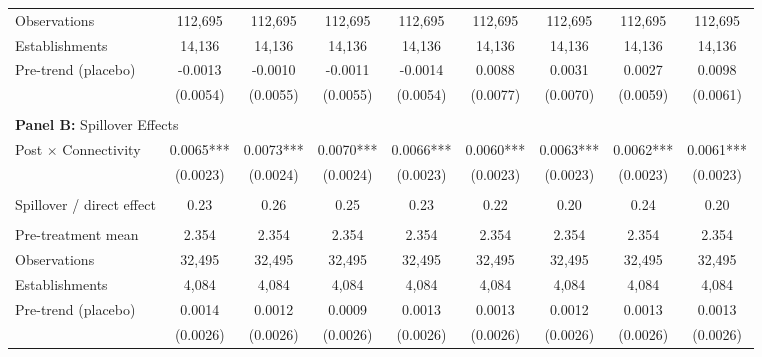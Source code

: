 \begin{table}[H]
\begin{tabular}{lcccccccc}
Observations & 112{,}695 & 112{,}695 & 112{,}695 & 112{,}695 & 112{,}695 & 112{,}695 & 112{,}695 & 112{,}695\\
Establishments & 14{,}136 & 14{,}136 & 14{,}136 & 14{,}136 & 14{,}136 & 14{,}136 & 14{,}136 & 14{,}136\\
\midrule
Pre-trend (placebo) & -0.0013 & -0.0010 & -0.0011 & -0.0014 & 0.0088 & 0.0031 & 0.0027 & 0.0098\\
  & (0.0054) & (0.0055) & (0.0055) & (0.0054) & (0.0077) & (0.0070) & (0.0059) & (0.0061)\\
 &  &  &  &  &  &  &  & \\
 \midrule
\multicolumn{9}{l}{\textbf{Panel B:} Spillover Effects} \\
Post $\times$ Connectivity & 0.0065*** & 0.0073*** & 0.0070*** & 0.0066*** & 0.0060*** & 0.0063*** & 0.0062*** & 0.0061***\\
  & (0.0023) & (0.0024) & (0.0024) & (0.0023) & (0.0023) & (0.0023) & (0.0023) & (0.0023)\\
 &  &  &  &  &  &  &  & \\
Spillover / direct effect & 0.23 & 0.26 & 0.25 & 0.23 & 0.22 & 0.20 & 0.24 & 0.20\\
 &  &  &  &  &  &  &  & \\
Pre-treatment mean & 2.354 & 2.354 & 2.354 & 2.354 & 2.354 & 2.354 & 2.354 & 2.354\\
Observations & 32{,}495 & 32{,}495 & 32{,}495 & 32{,}495 & 32{,}495 & 32{,}495 & 32{,}495 & 32{,}495\\
Establishments & 4{,}084 & 4{,}084 & 4{,}084 & 4{,}084 & 4{,}084 & 4{,}084 & 4{,}084 & 4{,}084\\
\midrule
Pre-trend (placebo) & 0.0014 & 0.0012 & 0.0009 & 0.0013 & 0.0013 & 0.0012 & 0.0013 & 0.0013\\
  & (0.0026) & (0.0026) & (0.0026) & (0.0026) & (0.0026) & (0.0026) & (0.0026) & (0.0026)\\
\bottomrule\bottomrule
\end{tabular}
\begin{minipage}{\linewidth}
    \scriptsize\vspace{4pt}

\end{minipage}
\end{table}
